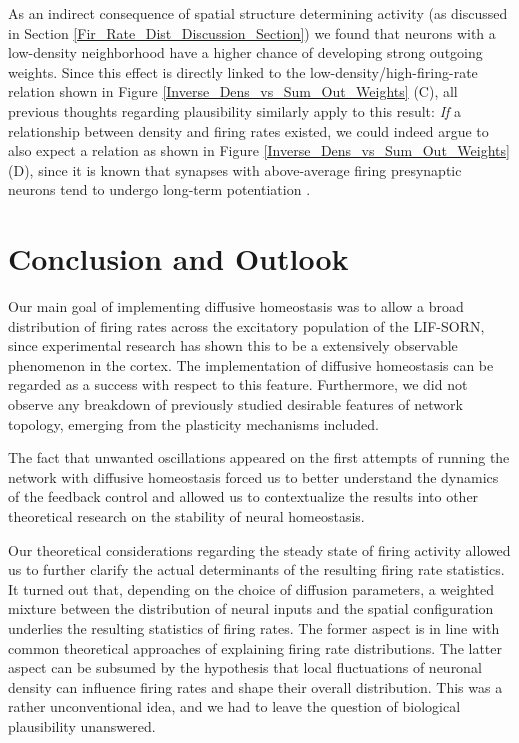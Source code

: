 \documentclass[10pt,a4paper]{article}
\begin{document}
As an indirect consequence of spatial structure determining activity (as discussed in Section \ref{Fir_Rate_Dist_Discussion_Section}) we found that neurons with a low-density neighborhood have a higher chance of developing strong outgoing weights. Since this effect is directly linked to the low-density/high-firing-rate relation shown in Figure \ref{Inverse_Dens_vs_Sum_Out_Weights} (C), all previous thoughts regarding plausibility similarly apply to this result: \emph{If} a relationship between density and firing rates existed, we could indeed argue to also expect a relation as shown in Figure \ref{Inverse_Dens_vs_Sum_Out_Weights} (D), since it is known that synapses with above-average firing presynaptic neurons tend to undergo long-term potentiation \cite{Sjoestroem_Syn_Plasticity_2001,Feldman_STDP_2012}.
\clearpage
\afterpage{\null\newpage}
\clearpage

\section{Conclusion and Outlook}\label{Conclusion_Section}
Our main goal of implementing diffusive homeostasis was to allow a broad distribution of firing rates across the excitatory population of the LIF-SORN, since experimental research has shown this to be a extensively observable phenomenon in the cortex. The implementation of diffusive homeostasis can be regarded as a success with respect to this feature. Furthermore, we did not observe any breakdown of previously studied desirable features of network topology, emerging from the plasticity mechanisms included. 

The fact that unwanted oscillations appeared on the first attempts of running the network with diffusive homeostasis forced us to better understand the dynamics of the feedback control and allowed us to contextualize the results into other theoretical research on the stability of neural homeostasis.

Our theoretical considerations regarding the steady state of firing activity allowed us to further clarify the actual determinants of the resulting firing rate statistics. It turned out that, depending on the choice of diffusion parameters, a weighted mixture between the distribution of neural inputs and the spatial configuration underlies the resulting statistics of firing rates. The former aspect is in line with common theoretical approaches of explaining firing rate distributions. The latter aspect can be subsumed by the hypothesis that local fluctuations of neuronal density can influence firing rates and shape their overall distribution. This was a rather unconventional idea, and we had to leave the question of biological plausibility unanswered.  
\end{document}
